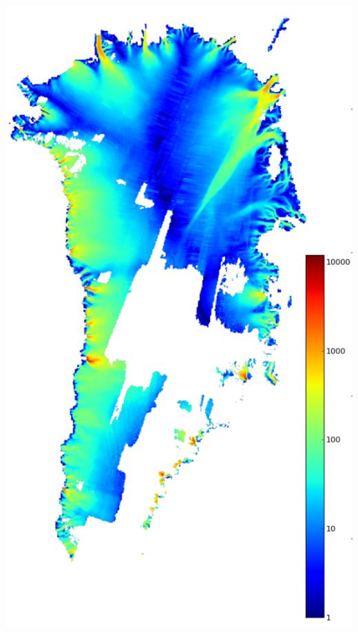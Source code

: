 \documentclass{beamer}
\begin{document}
\begin{frame}
\begin{columns}
\begin{column}{0.35\textwidth}
  \includegraphics[width=1.0\textwidth]{joughin}
\end{column}
\end{columns}
\end{frame}
\end{document}
